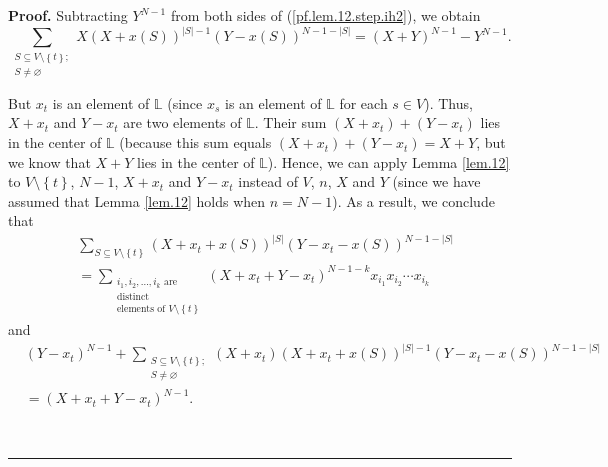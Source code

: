 \documentclass[numbers=enddot,12pt,final,onecolumn,notitlepage]{scrartcl}%
\theoremstyle{definition}
\newenvironment{proof}[1][Proof]{\noindent\textbf{#1.} }{\ \rule{0.5em}{0.5em}}
\let\sumnonlimits\sum
\renewcommand{\sum}{\sumnonlimits\limits}
\newenvironment{verlong}{}{}
\begin{document}
\begin{verlong}
\begin{proof}
Subtracting $Y^{N-1}$ from both sides of (\ref{pf.lem.12.step.ih2}), we obtain%
\begin{equation}
\sum_{\substack{S\subseteq V\setminus\left\{  t\right\}  ;\\S\neq\varnothing
}}X\left(  X+x\left(  S\right)  \right)  ^{\left\vert S\right\vert -1}\left(
Y-x\left(  S\right)  \right)  ^{N-1-\left\vert S\right\vert }=\left(
X+Y\right)  ^{N-1}-Y^{N-1}. \label{pf.lem.12.step.ih2b}%
\end{equation}


But $x_{t}$ is an element of $\mathbb{L}$ (since $x_{s}$ is an element of
$\mathbb{L}$ for each $s\in V$). Thus, $X+x_{t}$ and $Y-x_{t}$ are two
elements of $\mathbb{L}$. Their sum $\left(  X+x_{t}\right)  +\left(
Y-x_{t}\right)  $ lies in the center of $\mathbb{L}$ (because this sum equals
$\left(  X+x_{t}\right)  +\left(  Y-x_{t}\right)  =X+Y$, but we know that
$X+Y$ lies in the center of $\mathbb{L}$). Hence, we can apply Lemma
\ref{lem.12} to $V\setminus\left\{  t\right\}  $, $N-1$, $X+x_{t}$ and
$Y-x_{t}$ instead of $V$, $n$, $X$ and $Y$ (since we have assumed that Lemma
\ref{lem.12} holds when $n=N-1$). As a result, we conclude that%
\begin{align}
&  \sum_{S\subseteq V\setminus\left\{  t\right\}  }\left(  X+x_{t}+x\left(
S\right)  \right)  ^{\left\vert S\right\vert }\left(  Y-x_{t}-x\left(
S\right)  \right)  ^{N-1-\left\vert S\right\vert }\nonumber\\
&  =\sum_{\substack{i_{1},i_{2},\ldots,i_{k}\text{ are}\\\text{distinct}%
\\\text{elements of }V\setminus\left\{  t\right\}  }}\left(  X+x_{t}%
+Y-x_{t}\right)  ^{N-1-k}x_{i_{1}}x_{i_{2}}\cdots x_{i_{k}}
\label{pf.lem.12.step.ih1'}%
\end{align}
and%
\begin{align*}
&  \left(  Y-x_{t}\right)  ^{N-1} +\sum_{\substack{S\subseteq V\setminus
\left\{  t\right\}  ;\\S\neq\varnothing}}\left(  X+x_{t}\right)  \left(
X+x_{t}+x\left(  S\right)  \right)  ^{\left\vert S\right\vert -1}\left(
Y-x_{t}-x\left(  S\right)  \right)  ^{N-1-\left\vert S\right\vert }\\
&  =\left(  X+x_{t}+Y-x_{t}\right)  ^{N-1}.
\end{align*}



\end{proof}
\end{verlong}
\end{document}
